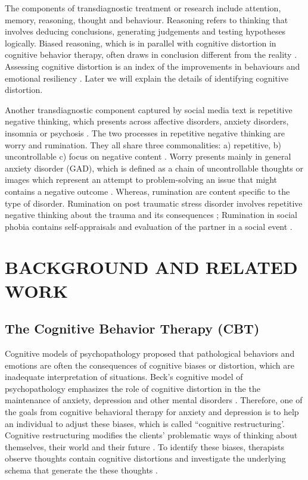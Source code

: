 The components of transdiagnostic treatment or research include attention, memory, reasoning, thought and behaviour. Reasoning refers to thinking that involves deducing conclusions, generating judgements and testing hypotheses logically. Biased reasoning, which is in parallel with cognitive distortion in cognitive behavior therapy, often draws in conclusion different from the reality \cite{Harvey04}. Assessing cognitive distortion is an index of the improvements in behaviours and emotional resiliency \cite{Freda00,Neil96}.  Later we will explain the details of identifying cognitive distortion.

Another transdiagnostic component captured by social media text is repetitive negative thinking, which presents across affective disorders, anxiety disorders, insomnia or psychosis \cite{Harvey04}. The two processes in repetitive negative thinking are worry and rumination. They all share three commonalities: a) repetitive, b) uncontrollable c) focus on negative content \cite{Harvey04}. Worry presents mainly in general anxiety disorder (GAD),  which is defined as a chain of uncontrollable thoughts or images which represent an attempt to problem-solving an issue that might contains a negative outcome \cite{Thomas83}. Whereas, rumination are content specific to the type of disorder. Rumination on post traumatic stress disorder involves repetitive negative thinking about the trauma and its consequences \cite{Michael07}; Rumination in social phobia contains self-appraisals and evaluation of the partner in a social event \cite{Kashdan07}. 


\section{BACKGROUND AND RELATED WORK}
\subsection{The Cognitive Behavior Therapy (CBT)}

Cognitive models of psychopathology proposed that pathological behaviors and emotions are often the consequences of cognitive biases or distortion, which are inadequate interpretation of situations. Beck's cognitive model of psychopathology emphasizes the role of cognitive distortion in the the maintenance of anxiety, depression and other mental disorders \cite{Beck67,Beck11}. Therefore, one of the goals from cognitive behavioral therapy for anxiety and depression is to help an individual to adjust these biases, which is called “cognitive restructuring’.  Cognitive restructuring modifies the clients' problematic ways of thinking about themselves, their world and their future \cite{Harvey04}. To identify these biases, therapists observe thoughts contain cognitive distortions and investigate the underlying schema that generate the these thoughts \cite{Beck11,Dobson09}. 


